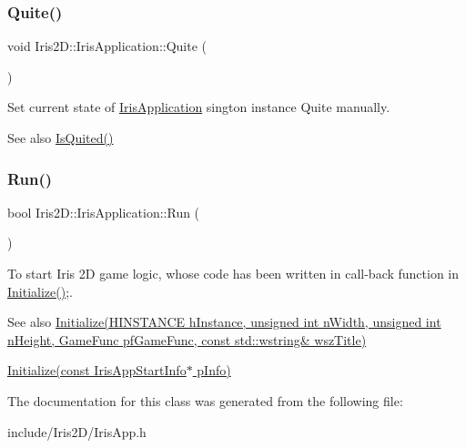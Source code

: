 \subsubsection{\texorpdfstring{Quite()}{Quite()}}
{\footnotesize\ttfamily void Iris2\+D\+::\+Iris\+Application\+::\+Quite (\begin{DoxyParamCaption}{ }\end{DoxyParamCaption})}



Set current state of \hyperlink{class_iris2_d_1_1_iris_application}{Iris\+Application} sington instance Quite manually. 

\begin{DoxySeeAlso}{See also}
\hyperlink{class_iris2_d_1_1_iris_application_ae9760ff496a4c80f96ad49331407c2e4}{Is\+Quited()} 
\end{DoxySeeAlso}
\mbox{\label{class_iris2_d_1_1_iris_application_ae6bb59365978c945201fd8cf82105e4f}} 
\subsubsection{\texorpdfstring{Run()}{Run()}}
{\footnotesize\ttfamily bool Iris2\+D\+::\+Iris\+Application\+::\+Run (\begin{DoxyParamCaption}{ }\end{DoxyParamCaption})}



To start Iris 2D game logic, whose code has been written in call-\/back function in \hyperlink{class_iris2_d_1_1_iris_application_a84f3ddebb3a3ffb0c172bd41fb952e1a}{Initialize()};. 

\begin{DoxySeeAlso}{See also}
\hyperlink{class_iris2_d_1_1_iris_application_a84f3ddebb3a3ffb0c172bd41fb952e1a}{Initialize(\+H\+I\+N\+S\+T\+A\+N\+C\+E h\+Instance, unsigned int n\+Width, unsigned int n\+Height, Game\+Func pf\+Game\+Func, const std\+::wstring\& wsz\+Title)} 

\hyperlink{class_iris2_d_1_1_iris_application_ac20656815694f980fccfc4369727a9a9}{Initialize(const Iris\+App\+Start\+Info$\ast$ p\+Info)} 
\end{DoxySeeAlso}


The documentation for this class was generated from the following file\+:\begin{DoxyCompactItemize}
\item 
include/\+Iris2\+D/Iris\+App.\+h\end{DoxyCompactItemize}

